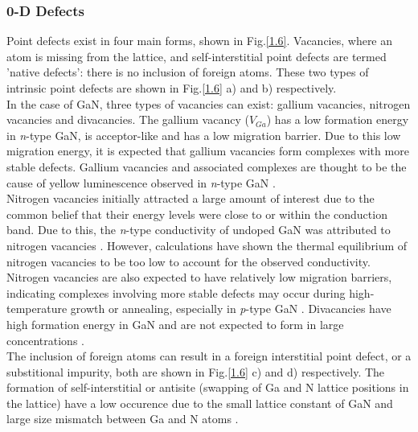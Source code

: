 \subsubsection{0-D Defects}
Point defects exist in four main forms, shown in Fig.\ref{1.6}. Vacancies, where an atom is missing from the lattice, and self-interstitial point defects are termed 'native defects': there is no inclusion of foreign atoms. These two types of intrinsic point defects are shown in Fig.\ref{1.6} a) and b) respectively.\\ 
In the case of GaN, three types of vacancies can exist: gallium vacancies, nitrogen vacancies and divacancies. The gallium vacancy ($V_{Ga}$) has a low formation energy in {\it n}-type GaN, is acceptor-like and has a low migration barrier. Due to this low migration energy, it is expected that gallium vacancies form complexes with more stable defects. Gallium vacancies and associated complexes are thought to be the cause of yellow luminescence observed in {\it n}-type GaN \cite{Bennett2010b}.\\
Nitrogen vacancies initially attracted a large amount of interest due to the common belief that their energy levels were close to or within the conduction band. Due to this, the {\it n}-type conductivity of undoped GaN was attributed to nitrogen vacancies \cite{StriteS.Morkoc1992}.  However, calculations have shown the thermal equilibrium of nitrogen vacancies to be too low to account for the observed conductivity. Nitrogen vacancies are also expected to have relatively low migration barriers, indicating complexes involving more stable defects may occur during high-temperature growth or annealing, especially in {\it p}-type GaN \cite{Reshchikov2005}. Divacancies have high formation energy in GaN and are not expected to form in large concentrations \cite{Reshchikov2005}.
\\The inclusion of foreign atoms can result in a foreign interstitial point defect, or a substitional impurity, both are shown in Fig.\ref{1.6} c) and d) respectively. The formation of self-interstitial or antisite (swapping of Ga and N lattice positions in the lattice) have a low occurence due to the small lattice constant of GaN and large size mismatch between Ga and N atoms \cite{Reshchikov2005}.
